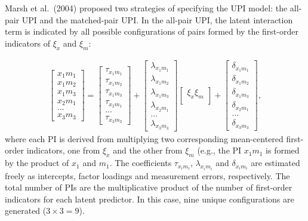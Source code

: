 \documentclass[
  man]{apa6}
\begin{document}
Marsh et al.~(2004) proposed two strategies of specifying the UPI model: the all-pair UPI and the matched-pair UPI. In the all-pair UPI, the latent interaction term is indicated by all possible configurations of pairs formed by the first-order indicators of \(\xi_{x}\) and \(\xi_m\):

\begin{align}
    \begin{bmatrix}
        x_{1}m_{1} \\
        x_{1}m_{2} \\
        x_{1}m_{3} \\ 
        x_{2}m_{1} \\
        ... \\
        x_{3}m_{3}
    \end{bmatrix} = 
    \begin{bmatrix}
        \tau_{x_{1}m_{1}} \\
        \tau_{x_{1}m_{2}} \\ 
        \tau_{x_{1}m_{3}} \\ 
        \tau_{x_{2}m_{1}} \\ 
        ...\\
        \tau_{x_{3}m_{3}} 
    \end{bmatrix} +
    \begin{bmatrix}
        \lambda_{x_{1}m_{1}} \\
        \lambda_{x_{1}m_{2}} \\ 
        \lambda_{x_{1}m_{3}} \\ 
        \lambda_{x_{2}m_{1}} \\ 
        ...\\
        \lambda_{x_{3}m_{3}}
    \end{bmatrix}
    \begin{bmatrix}
        \xi_{x}\xi_{m} \\
    \end{bmatrix} +
    \begin{bmatrix}
        \delta_{x_{1}m_{1}} \\
        \delta_{x_{1}m_{2}} \\ 
        \delta_{x_{1}m_{3}} \\
        \delta_{x_{2}m_{1}} \\
        ... \\
        \delta_{x_{3}m_{3}}
    \end{bmatrix},
\end{align}
where each PI is derived from multiplying two corresponding mean-centered first-order indicators, one from \(\xi_{x}\) and the other from \(\xi_{m}\) (e.g., the PI \(x_{1}m_{1}\) is formed by the product of \(x_{1}\) and \(m_{1}\). The coefficients \({\tau_{x_{i}m_{i}}}\), \({\lambda_{x_{i}m_{i}}}\) and \({\delta_{x_{i}m_{i}}}\) are estimated freely as intercepts, factor loadings and measurement errors, respectively. The total number of PIs are the multiplicative product of the number of first-order indicators for each latent predictor. In this case, nine unique configurations are generated (\(3 \times 3 = 9\)).
\end{document}
